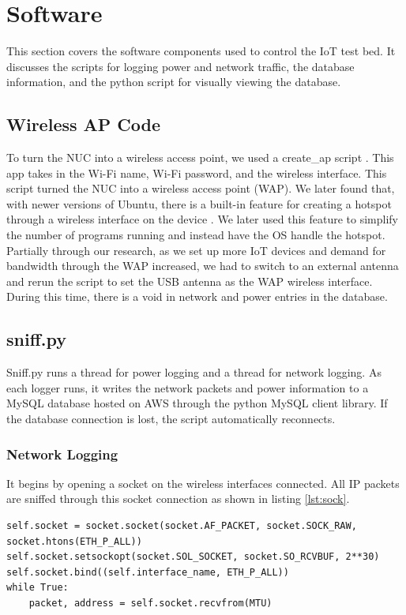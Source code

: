 \section{Software}
\label{software}
This section covers the software components used to control the IoT test bed. It discusses the scripts for logging power and network traffic, the database information, and the python script for visually viewing the database.

\subsection{Wireless AP Code}
To turn the NUC into a wireless access point, we used a create\_ap script \cite{oblique_2017}. This app takes in the Wi-Fi name, Wi-Fi password, and the wireless interface. This script turned the NUC into a wireless access point (WAP). We later found that, with newer versions of Ubuntu, there is a built-in feature for creating a hotspot through a wireless interface on the device \cite{m_2016}. We later used this feature to simplify the number of programs running and instead have the OS handle the hotspot. Partially through our research, as we set up more IoT devices and demand for bandwidth through the WAP increased, we had to switch to an external antenna and rerun the script to set the USB antenna as the WAP wireless interface. During this time, there is a void in network and power entries in the database.

\subsection{sniff.py}
\label{sniff.py}

Sniff.py runs a thread for power logging and a thread for network logging. As each logger runs, it writes the network packets and power information to a MySQL database hosted on AWS through the python MySQL client \cite{mysqlclient} library. If the database connection is lost, the script automatically reconnects.

\subsubsection{Network Logging}

It begins by opening a socket on the wireless interfaces connected. All IP packets are sniffed through this socket connection as shown in listing \ref{lst:sock}.

\noindent
\begin{minipage}{\textwidth}
\begin{lstlisting}[label={lst:sock},caption={Open and Read from a Socket},captionpos=b]
self.socket = socket.socket(socket.AF_PACKET, socket.SOCK_RAW, socket.htons(ETH_P_ALL))
self.socket.setsockopt(socket.SOL_SOCKET, socket.SO_RCVBUF, 2**30)
self.socket.bind((self.interface_name, ETH_P_ALL))
while True:
    packet, address = self.socket.recvfrom(MTU)
\end{lstlisting}
\end{minipage}

